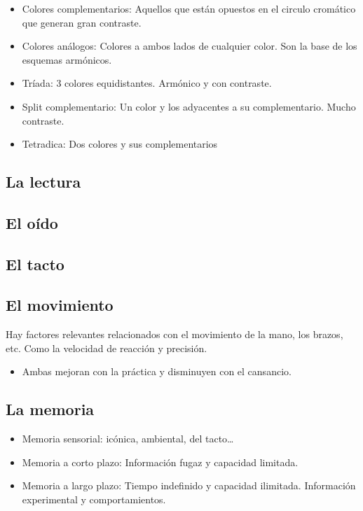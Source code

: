 \documentclass[12pt, twoside, openright]{report} %
\begin{document}
\begin{itemize}
\begin{itemize}
\begin{itemize}
			            \item Colores complementarios: Aquellos que están opuestos en el
			                  circulo cromático que generan gran contraste.

			            \item Colores análogos: Colores a ambos lados de cualquier color.
			                  Son la base de los esquemas armónicos.

			            \item Tríada: 3 colores equidistantes. Armónico y con contraste.

			            \item Split complementario: Un color y los adyacentes a su
			                  complementario. Mucho contraste.

			            \item Tetradica: Dos colores y sus complementarios
		            \end{itemize}
	      \end{itemize}
\end{itemize}
\subsection{La lectura}
\subsection{El oído}
\subsection{El tacto}
\subsection{El movimiento}
Hay factores relevantes relacionados con el
movimiento de la mano, los brazos, etc. Como la velocidad de
reacción y precisión.

\begin{itemize}
	\item Ambas mejoran con la práctica y disminuyen con el cansancio.
\end{itemize}
\subsection{La memoria}

\begin{itemize}
	\item Memoria sensorial: icónica, ambiental, del tacto\ldots{}
	\item Memoria a corto plazo: Información fugaz y capacidad limitada.
	\item Memoria a largo plazo: Tiempo indefinido y capacidad ilimitada.
	      Información experimental y comportamientos.
\end{itemize}
\end{document}
